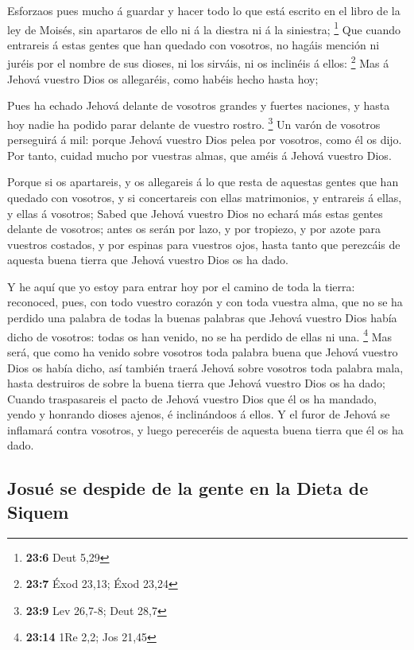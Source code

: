  Esforzaos pues mucho á guardar y hacer todo lo que está
escrito en el libro de la ley de Moisés, sin apartaros de ello ni á la
diestra ni á la siniestra; \footnote{\textbf{23:6} Deut 5,29}
 Que cuando entrareis á estas gentes que han quedado con
vosotros, no hagáis mención ni juréis por el nombre de sus dioses, ni
los sirváis, ni os inclinéis á ellos: \footnote{\textbf{23:7} Éxod
  23,13; Éxod 23,24}  Mas á Jehová vuestro Dios os
allegaréis, como habéis hecho hasta hoy;

 Pues ha echado Jehová delante de vosotros grandes y fuertes
naciones, y hasta hoy nadie ha podido parar delante de vuestro rostro.
\footnote{\textbf{23:9} Lev 26,7-8; Deut 28,7}  Un varón de
vosotros perseguirá á mil: porque Jehová vuestro Dios pelea por
vosotros, como él os dijo.  Por tanto, cuidad mucho por
vuestras almas, que améis á Jehová vuestro Dios.

 Porque si os apartareis, y os allegareis á lo que resta de
aquestas gentes que han quedado con vosotros, y si concertareis con
ellas matrimonios, y entrareis á ellas, y ellas á vosotros;
 Sabed que Jehová vuestro Dios no echará más estas gentes
delante de vosotros; antes os serán por lazo, y por tropiezo, y por
azote para vuestros costados, y por espinas para vuestros ojos, hasta
tanto que perezcáis de aquesta buena tierra que Jehová vuestro Dios os
ha dado.

 Y he aquí que yo estoy para entrar hoy por el camino de
toda la tierra: reconoced, pues, con todo vuestro corazón y con toda
vuestra alma, que no se ha perdido una palabra de todas la buenas
palabras que Jehová vuestro Dios había dicho de vosotros: todas os han
venido, no se ha perdido de ellas ni una. \footnote{\textbf{23:14} 1Re
  2,2; Jos 21,45}  Mas será, que como ha venido sobre
vosotros toda palabra buena que Jehová vuestro Dios os había dicho, así
también traerá Jehová sobre vosotros toda palabra mala, hasta destruiros
de sobre la buena tierra que Jehová vuestro Dios os ha dado;
 Cuando traspasareis el pacto de Jehová vuestro Dios que él
os ha mandado, yendo y honrando dioses ajenos, é inclinándoos á ellos. Y
el furor de Jehová se inflamará contra vosotros, y luego pereceréis de
aquesta buena tierra que él os ha dado.

\hypertarget{josuuxe9-se-despide-de-la-gente-en-la-dieta-de-siquem}{%
\subsection{Josué se despide de la gente en la Dieta de
Siquem}\label{josuuxe9-se-despide-de-la-gente-en-la-dieta-de-siquem}}

